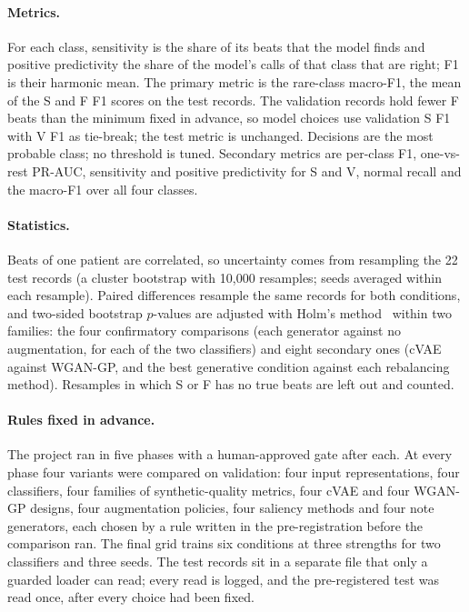 \documentclass[11pt]{article}
\begin{document}
\begin{table}[htbp]\centering\small\caption{Records and beats per split.}\label{tab:data}\end{table}

\paragraph{Metrics.} For each class, sensitivity is the share of its beats that the model finds and positive predictivity the share
of the model's calls of that class that are right; F1 is their harmonic mean. The primary metric is the rare-class macro-F1, the mean of
the S and F F1 scores on the test records. The validation records hold fewer F beats than the minimum fixed in advance, so model choices
use validation S F1 with V F1 as tie-break; the test metric is unchanged. Decisions are the most probable class; no threshold is tuned.
Secondary metrics are per-class F1, one-vs-rest PR-AUC, sensitivity and positive predictivity for S and V, normal recall and the
macro-F1 over all four classes.

\paragraph{Statistics.} Beats of one patient are correlated, so uncertainty comes from resampling the 22 test records (a cluster
bootstrap with 10,000 resamples; seeds averaged within each resample). Paired differences resample the same records for both conditions,
and two-sided bootstrap $p$-values are adjusted with Holm's method~\cite{holm1979} within two families: the four confirmatory
comparisons (each generator against no augmentation, for each of the two classifiers) and eight secondary ones (cVAE against WGAN-GP, and
the best generative condition against each rebalancing method). Resamples in which S or F has no true beats are left out and counted.

\paragraph{Rules fixed in advance.} The project ran in five phases with a human-approved gate after each. At every phase four variants
were compared on validation: four input representations, four classifiers, four families of synthetic-quality metrics, four cVAE and
four WGAN-GP designs, four augmentation policies, four saliency methods and four note generators, each chosen by a rule written in the
pre-registration before the comparison ran. The final grid trains six conditions at three strengths for two classifiers and three
seeds. The test records sit in a separate file that only a guarded loader can read; every read is logged, and the pre-registered test
was read once, after every choice had been fixed.
\end{document}
